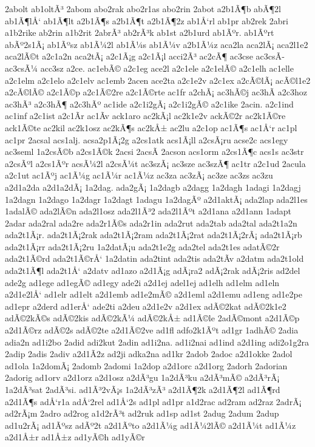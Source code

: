 {2abolt
ab1oltÃ³
2abom
abo2rak
abo2r1as
abo2rin
2abot
a2b1Ã¶b
abÃ¶2l
ab1Ã¶lÅ‘
ab1Ã¶lt
a2b1Ã¶s
a2b1Ã¶t
a2b1Ã¶2z
ab1Å‘rl
ab1pr
ab2rek
2abri
a1b2rike
ab2rin
a1b2rit
2abrÃ³
ab2rÃ³k
ab1st
a2b1urd
ab1Ãºr.
ab1Ãºrt
abÃº2s1Ã¡
ab1Ãºsz
ab1Ã¼2l
ab1Ã¼s
ab1Ã¼v
a2b1Ã¼z
aca2la
aca2lÃ¡
aca2l1e2
aca2lÃ©t
a2c1a2n
aca2tÃ¡
a2c1Ã¡g
a2c1Ã¡l
acci2Ã³
ac2cÃ¶
ac3cse
ac3csÃ­
ac3csÃ¼
acc3sz
a2ce.
ac1ebÃ©
a2c1eg
ace2l
a2c1ele
a2c1elÃ©
a2c1elh
ac1elle
a2c1elm
a2c1elo
a2c1elv
ac1emb
2acen
ace2ta
a2c1e2v
a2c1ex
a2cÃ©lÃ¡
acÃ©l1e2
a2cÃ©lÃ©
a2c1Ã©p
a2c1Ã©2re
a2c1Ã©rte
ac1fr
a2chÃ¡
ac3hÃ©j
ac3hÃ­
a2c3hoz
ac3hÃ³
a2c3hÃ¶
a2c3hÃº
ac1ide
a2c1i2gÃ¡
a2c1i2gÃ©
a2c1ike
2acin.
a2c1ind
ac1inf
a2c1ist
a2c1Ã­r
ac1Ã­v
ack1aro
ac2kÃ¡l
ac2k1e2v
ackÃ©2r
ac2k1Ã©re
ack1Ã©te
ac2kil
ac2k1osz
ac2kÃ¶s
ac2kÅ±
ac2lu
a2c1op
ac1Ã¶s
ac1Å‘r
ac1pl
ac1pr
2acsal
acs1alj.
acsa2p1Ã¡2g
a2cs1atk
acs1Ã¡ll
a2csÃ¡ru
acse2c
acs1egy
ac3seml
1a2csÃ©b
a2cs1Ã©k
2acsi
2acsÃ­
2acson
acs1orm
a2cs1Ã¶c
acs1s
ac3str
a2csÃºl
a2cs1Ãºr
acsÃ¼2l
a2csÃ¼t
ac3szÃ¡
ac3sze
ac3szÃ¶
ac1tr
a2c1ud
2acula
a2c1ut
ac1Ãºj
ac1Ã¼g
ac1Ã¼r
ac1Ã¼z
ac3za
ac3zÃ¡
ac3ze
ac3zs
ac3zu
a2d1a2da
a2d1a2dÃ¡
1a2dag.
ada2gÃ¡
1a2dagb
a2dagg
1a2dagh
1adagi
1a2dagj
1a2dagn
1a2dago
1a2dagr
1a2dagt
1adagu
1a2dagÃº
a2d1aktÃ¡
ada2lap
ada2l1es
1adalÃ©
ada2lÃ©n
ada2l1osz
ada2l1Ã³2
ada2l1Ãºt
a2d1ana
a2d1ann
1adapt
2adar
ada2ral
ada2re
ada2r1Ã©s
ada2r1in
ada2rut
ada2tab
ada2tal
ada2t1a2n
ada2t1Ã¡r.
ada2t1Ã¡2rak
ada2t1Ã¡2ram
ada2t1Ã¡2rat
ada2t1Ã¡2rÃ¡
ada2t1Ã¡rb
ada2t1Ã¡rr
ada2t1Ã¡2ru
1a2datÃ¡u
ada2t1e2g
ada2tel
ada2t1es
adatÃ©2r
ada2t1Ã©rd
ada2t1Ã©rÅ‘
1a2datin
ada2tint
ada2tis
ada2tÃ­v
a2datm
ada2t1old
ada2t1Ã¶l
ada2t1Å‘
a2datv
ad1azo
a2d1Ã¡g
adÃ¡ra2
adÃ¡2rak
adÃ¡2ris
ad2del
ade2g
ad1ege
ad1egÃ©
ad1egy
ade2i
a2d1ej
adel1ej
ad1elh
ad1elm
ad1eln
a2d1e2lÅ‘
ad1elr
ad1elt
a2d1emb
ad1e2mÃ©
a2d1eml
a2d1emu
ad1eng
ad1e2pe
ad1epr
a2derd
ad1erÅ‘
ade2ti
a2deu
a2d1e2v
a2d1ex
adÃ©2kat
adÃ©2k1e2
adÃ©2kÃ©s
adÃ©2kis
adÃ©2kÃ¼
adÃ©2kÅ±
ad1Ã©le
2adÃ©mont
a2d1Ã©p
a2d1Ã©rz
adÃ©2s
adÃ©2te
a2d1Ã©2ve
ad1fl
adfo2k1Ãºt
ad1gr
1adhÃ©
2adia
adia2n
ad1i2bo
2adid
adi2kut
2adin
ad1i2na.
ad1i2nai
ad1ind
a2d1ing
adi2o1g2ra
2adip
2adis
2adiv
a2d1Ã­2z
ad2ji
adka2na
ad1kr
2adob
2adoc
a2d1okke
2adol
ad1ola
1a2domÃ¡
2adomb
2adomi
1a2dop
a2d1orc
a2d1org
2adorh
2adorian
2adorig
ad1orv
a2d1orz
a2d1osz
a2dÃ³gu
1a2dÃ³ku
a2dÃ³mÃ©
a2dÃ³rÃ¡
1a2dÃ³sat
2adÃ³si.
ad1Ã³2vÃ¡s
1a2dÃ³zÃ³
a2d1Ã¶2k
a2d1Ã¶2l
ad1Ã¶rd
a2d1Ã¶s
adÅ‘r1a
adÅ‘2rel
ad1Å‘2s
ad1pl
ad1pr
a1d2rac
ad2ram
ad2raz
2adrÃ¡
ad2rÃ¡m
2adro
ad2rog
a1d2rÃ³t
ad2ruk
ad1sp
ad1st
2adug
2adum
2adup
ad1u2rÃ¡
ad1Ãºsz
adÃº2t
a2d1Ãºto
a2d1Ã¼g
ad1Ã¼2lÃ©
a2d1Ã¼t
ad1Ã¼z
a2d1Å±r
ad1Å±z
ad1yÃ©h
ad1yÃ©r
}
